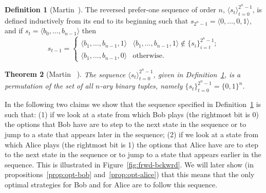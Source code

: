 \documentclass[final,12pt]{elsarticle}
\newtheorem{theorem}{Theorem} \newtheorem{proposition}[theorem]{Proposition} \newtheorem{claim}[theorem]{Claim}
\theoremstyle{definition} \newtheorem{definition}[theorem]{Definition} \newtheorem{observation}[theorem]{Observation} \newtheorem{example}[theorem]{Example} \newtheorem{remark}[theorem]{Remark} \newtheorem{corrolary}[theorem]{Corrolary}
\newcommand{\REF}[2]{#1~\ref{#2}}
\newcommand{\T}[1]{\langle{#1}\rangle} \DeclareMathOperator{\drop}{drop} \DeclareMathOperator{\dropbits}{drop\_bits} \DeclareMathOperator{\dropstates}{drop\_states} \DeclareMathOperator{\leadingForm}{LeadingForm} \DeclareMathOperator{\dv}{div} %
\begin{document}
\begin{definition}[Martin~\cite{Mar34}]

	\label{Def:pref1} The reversed prefer-one sequence of order $n$, $\langle s_t
		\rangle_{t=0}^{2^n-1}$, is defined inductively from its end to its beginning such that $s_{2^n-1}=
		\T{0,\dots,0,1}$, and if $s_t=\T{b_0,\dots,b_{n-1}}$ then $$ s_{t-1} =
		\begin{cases}
			\T{b_1,\dots,b_{n-1},1} &
			\T{b_1,\dots,b_{n-1},1} \notin \{s_i\}_{i=t}^{2^n-1}; \\
			\T{b_1,\dots,b_{n-1},0} &
			\text{otherwise}.
		\end{cases}
	$$
\end{definition}

\begin{theorem}[Martin~
		\cite{Mar34}]

	\label{Thm:pref1-is-debruijn} The sequence $
		\T{s_t}_{t=0}^{2^n-1}$, given in
	\REF{Definition}{Def:pref1}, is a permutation of the set of all $n$-ary binary tuples, namely $\{s_t\}_{t=0}^{2^n-1}=\{0,1\}^n$.
\end{theorem}

In the following two claims we show that the sequence specified in \REF{Definition}{Def:pref1} is such that: (1) if we look at a state from which Bob plays (the rightmost bit is 0) the options that Bob have are to step to the next state in the sequence or to jump to a state that appears later in the sequence; (2) if we look at a state from which Alice plays (the rightmost bit is 1) the options that Alice have are to step to the next state in the sequence or to jump to a state that appears earlier in the sequence. This is illustrated in Figure~\ref{fig:frwd-bckwrd}. We will later show (in propositions~\ref{prop:opt-bob} and~\ref{prop:opt-alice}) that this means that the only optimal strategies for Bob and for Alice are to follow this sequence.
\end{document}
